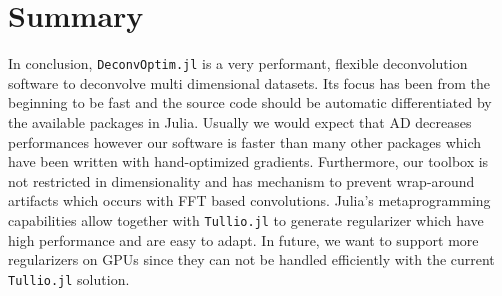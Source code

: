 \documentclass{juliacon}
\begin{document}
\section{Summary}
    In conclusion, \verb|DeconvOptim.jl| is a very performant, flexible deconvolution software to deconvolve multi dimensional datasets.
    Its focus has been from the beginning to be fast and the source code should be automatic differentiated by the available
    packages in Julia. Usually we would expect that AD decreases performances however our software is faster than
    many other packages which have been written with hand-optimized gradients.
    Furthermore, our toolbox is not restricted in dimensionality and has mechanism to prevent wrap-around artifacts which
    occurs with FFT based convolutions.
    Julia's metaprogramming capabilities allow together with \verb|Tullio.jl| to generate regularizer which have high performance
    and are easy to adapt.
    In future, we want to support more regularizers on GPUs since they can not be handled efficiently with the current \verb|Tullio.jl| solution.
    



\end{document}
